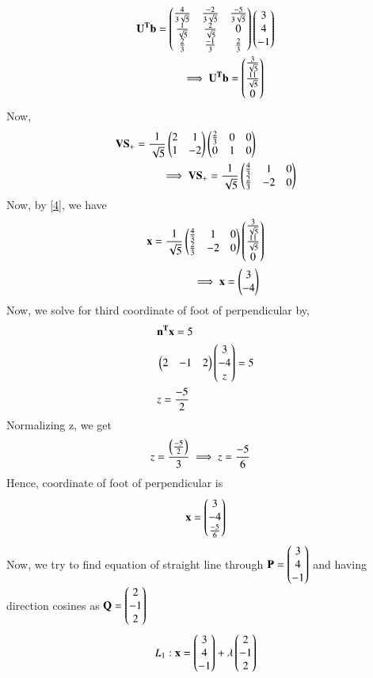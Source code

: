 \documentclass[journal,12pt,twocolumn]{IEEEtran}
\begin{document}
\begin{align}
& \mathbf{U^Tb} =  \begin{pmatrix}\frac{4}{3\sqrt{5}} & \frac{-2}{3\sqrt{5}} & \frac{-5}{3\sqrt{5}} \\ \frac{1}{\sqrt{5}}   & \frac{2}{\sqrt{5}} & 0 \\ \frac{2}{3} & \frac{-1}{3} & \frac{2}{3}\end{pmatrix}
\begin{pmatrix}3 \\4\\-1\end{pmatrix} \\
& \qquad \qquad\implies \mathbf{U^Tb} = \begin{pmatrix}\frac{3}{\sqrt{5}} \\ \frac{11}{\sqrt{5}} \\ 0\end{pmatrix} 
\end{align}
Now,
\begin{align}
& \mathbf{VS_+} = \frac{1}{\sqrt{5}}\begin{pmatrix}2 & 1 \\ 1 & -2 \end{pmatrix}\begin{pmatrix}\frac{2}{3} & 0 & 0 \\ 0 & 1 & 0\end{pmatrix}\\
& \qquad \qquad \implies \mathbf{VS_+} = \frac{1}{\sqrt{5}}\begin{pmatrix}\frac{4}{3} & 1 &0 \\ \frac{2}{3} & -2 & 0 \end{pmatrix}
\end{align}
Now, by \eqref{4}, we have
\begin{align}
& \mathbf{x} = \frac{1}{\sqrt{5}}\begin{pmatrix}\frac{4}{3} & 1 &0 \\ \frac{2}{3} & -2 & 0 \end{pmatrix} 
\begin{pmatrix}\frac{3}{\sqrt{5}} \\ \frac{11}{\sqrt{5}} \\ 0\end{pmatrix}  \\
& \qquad \qquad \implies \mathbf{x} = \begin{pmatrix}3 \\ -4\end{pmatrix}
\end{align}
Now, we solve for third coordinate of foot of perpendicular by,
\begin{align}
&\mathbf{n^Tx} = 5 \\
& \begin{pmatrix}2 & -1 & 2\end{pmatrix}\begin{pmatrix}3 \\ -4 \\ z\end{pmatrix} = 5\\
& z = \frac{-5}{2}
\end{align}
Normalizing z, we get
\begin{align}
	& z = \frac{\left(\frac{-5}{2}\right)}{3} \implies z = \frac{-5}{6}
\end{align}
Hence, coordinate of foot of perpendicular is
\begin{align}
	\mathbf{x} = \begin{pmatrix}3 \\ -4\\\frac{-5}{6}\end{pmatrix}
\end{align}
Now, we try to find equation of straight line through $\mathbf{P}= \begin{pmatrix}3\\4\\-1\end{pmatrix}$ and having direction cosines as $\mathbf{Q}= \begin{pmatrix}2 \\-1 \\ 2\end{pmatrix}$
\begin{align}
	L_1 :  \mathbf{x} = \begin{pmatrix}3\\4\\-1\end{pmatrix} + \lambda\begin{pmatrix}2 \\-1\\2\end{pmatrix}
\end{align}
\end{document}
